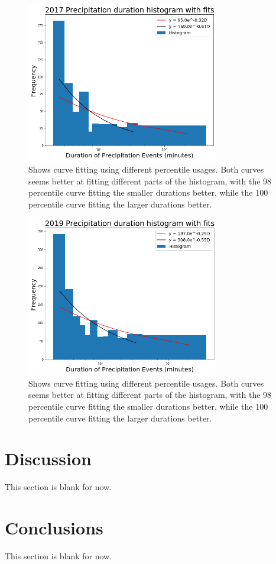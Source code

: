 \documentclass[11pt]{report}
\begin{document}
\clearpage
\begin{figure}[t]
	\centering
	\includegraphics[width=0.75\textwidth]{Figures/precip17_new.png}
	\caption[2017 Exponentials with contrasting curve fitting]
	{\label{precip17_redone}
		Shows curve fitting using different percentile usages. Both curves seems better at fitting different parts of the histogram, with the 98 percentile curve fitting the smaller durations better, while the 100 percentile curve fitting the larger durations better. }
\end{figure}
\begin{figure}[b]
	\centering
	\includegraphics[width=0.75\textwidth]{Figures/precip19_new.png}
	\caption[2019 Exponentials with contrasting curve fitting]
	{\label{precip19_redone}
		Shows curve fitting using different percentile usages. Both curves seems better at fitting different parts of the histogram, with the 98 percentile curve fitting the smaller durations better, while the 100 percentile curve fitting the larger durations better. }
\end{figure}

	
\section{Discussion\label{sec:discussion}}
This section is blank for now. 

\section{Conclusions\label{sec:conclusions}}
This section is blank for now. 

\small
\renewcommand{\bibsep}{0em}

\renewcommand{\bibname}{References}


\end{document}
